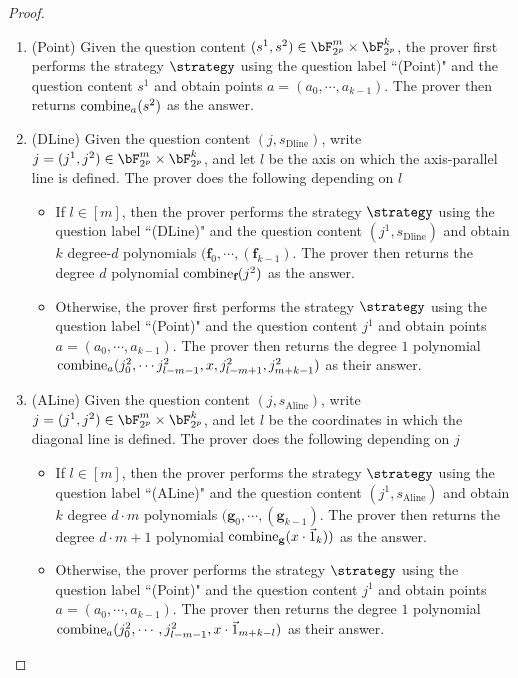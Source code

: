 \begin{proof}
	\begin{enumerate}
		\item (Point) Given the question content $(s^1,s^2) \in \bF_{2^p}^m \times \bF_{2^p}^k$, the prover first performs the strategy $\strategy$ using the question label ``(Point)" and the question content $s^1$ and obtain points $ a = (a_0, \cdots, a_{k-1})$. The prover then returns $\text{combine}_{a} (s^2)$ as the answer. 
		\item (DLine) Given the question content $(j,s_{\text{Dline}})$, write $j = (j^1, j^2) \in  \bF_{2^p}^m \times \bF_{2^p}^k$, and let $l$ be the axis on which the axis-parallel line is defined. The prover does the following depending on $l$
		\begin{itemize}
			\item If $l \in [m]$, then the prover performs the strategy $\strategy$ using the question label ``(DLine)" and the question content $(j^1,s_{\text{Dline}})$ and obtain $k$ degree-$d$ polynomials $(\textbf{f}_0, \cdots, (\textbf{f}_{k-1})$. The prover then returns the degree $d$ polynomial $\text{combine}_{\textbf{f}} (j^2)$ as the answer. 
			\item  Otherwise, the prover first performs the strategy $\strategy$ using the question label ``(Point)" and the question content $j^1$ and obtain points $ a = (a_0, \cdots, a_{k-1})$. The prover then returns the degree $1$ polynomial $\text{combine}_{a} (j^2_0, \cdots j^2_{l-m-1}, x,  j^2_{l-m+1}, j^2_{m+k -1} )$ as their answer. 
		\end{itemize}
		\item (ALine)  Given the question content $(j,s_{\text{Aline}})$, write $j = (j^1, j^2) \in  \bF_{2^p}^m \times \bF_{2^p}^k$, and let $l$ be the coordinates in which the diagonal line is defined. The prover does the following depending on $j$
		\begin{itemize}
			\item If $l \in [m]$, then the prover performs the strategy $\strategy$ using the question label ``(ALine)" and the question content $(j^1,s_{\text{Aline}})$ and obtain $k$ degree $d \cdot m$ polynomials $(\textbf{g}_0, \cdots, (\textbf{g}_{k-1})$. The prover then returns the degree $d \cdot m+1$ polynomial $\text{combine}_{\textbf{g}} (x \cdot \vec{1}_k))$ as the answer. 
			\item  Otherwise, the prover performs the strategy $\strategy$ using the question label ``(Point)" and the question content $j^1$ and obtain points $ a = (a_0, \cdots, a_{k-1})$. The prover then returns the degree $1$ polynomial $\text{combine}_{a} (j^2_0, \cdots, j^2_{l-m-1}, x \cdot \vec{1}_{m+k - l} )$ as their answer. 

\end{itemize}
\end{enumerate}
\end{proof}
